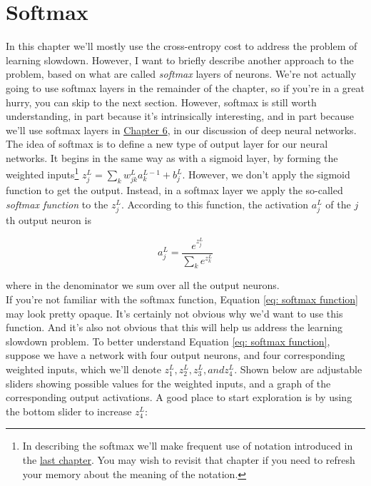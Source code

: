 \documentclass[a4paper,11pt,twoside]{report}
\begin{document}
\section{Softmax}
\label{sec: Softmax}

In this chapter we'll mostly use the cross-entropy cost to address the problem of learning slowdown. However, I want to briefly describe another approach to the problem, based on what are called \textit{softmax} layers of neurons. We're not actually going to use softmax layers in the remainder of the chapter, so if you're in a great hurry, you can skip to the next section. However, softmax is still worth understanding, in part because it's intrinsically interesting, and in part because we'll use softmax layers in \hyperref[chap: Deep learning]{Chapter 6}, in our discussion of deep neural networks.\\

The idea of softmax is to define a new type of output layer for our neural networks. It begins in the same way as with a sigmoid layer, by forming the weighted inputs\footnote{In describing the softmax we'll make frequent use of notation introduced in the \hyperref[chap: How the backpropagation algorithm works]{last chapter}. You may wish to revisit that chapter if you need to refresh your memory about the meaning of the notation.} $z^L_j=\sum_k w^L_{jk} a^{L-1}_k+b^L_j$. However, we don't apply the sigmoid function to get the output. Instead, in a softmax layer we apply the so-called \textit{softmax function} to the $z^L_j$. According to this function, the activation $a^L_j$ of the $j$th output neuron is

\begin{equation}
a^L_j=\frac{e^{z^L_j}}{\sum_k e^{z^L_k}}
\label{eq: softmax function}
\end{equation}

where in the denominator we sum over all the output neurons.\\

If you're not familiar with the softmax function, Equation \ref{eq: softmax function} may look pretty opaque. It's certainly not obvious why we'd want to use this function. And it's also not obvious that this will help us address the learning slowdown problem. To better understand Equation \ref{eq: softmax function}, suppose we have a network with four output neurons, and four corresponding weighted inputs, which we'll denote $z^L_1, z^L_2, z^L_3, and z^L_4$. Shown below are adjustable sliders showing possible values for the weighted inputs, and a graph of the corresponding output activations. A good place to start exploration is by using the bottom slider to increase $z^L_4$:
\end{document}
